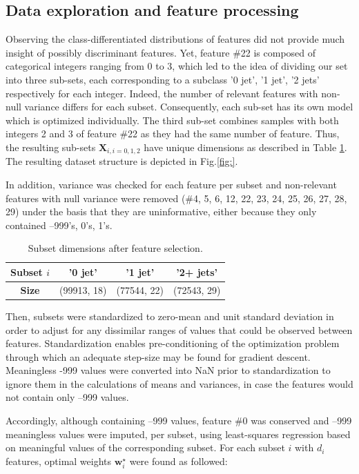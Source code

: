 \documentclass[10pt,conference,compsocconf]{IEEEtran}
\begin{document}
\subsection{Data exploration and feature processing}
Observing the class-differentiated distributions of features did not provide much insight of possibly discriminant features. 
Yet, feature \#22 is composed of categorical integers ranging from 0 to 3, which led to the idea of dividing our set into three sub-sets, 
each corresponding to a subclass '0 jet', '1 jet', '2 jets' respectively for each integer. 
Indeed, the number of relevant features with non-null variance differs for each subset. Consequently, each sub-set has its own model which is optimized individually.
The third sub-set combines samples with both integers 2 and 3 of feature \#22 as they had the same number of feature. 
Thus, the resulting sub-sets $\mathbf{X}_{i, i=0,1,2}$ have unique dimensions as described in Table \ref{tab:subset}. The resulting dataset structure is depicted in Fig.\ref{fig:}.

In addition, variance was checked for each feature per subset and non-relevant features with null variance were removed 
(\#4, 5, 6, 12, 22, 23, 24, 25, 26, 27, 28, 29) under the basis that they are uninformative, either because they only contained --999's, 0's, 1's.

\begin{table}[]
    \centering
     \caption{Subset dimensions after feature selection.}
    \label{tab:subset}
    \begin{tabular}{|c|c|c|c|}
    \hline
    \textbf{Subset} $i$ &  '0 jet' &  '1 jet' & '2+ jets' \\
    \hline
    \textbf{Size} & (99913, 18) & (77544, 22) & (72543, 29) \\
    \hline
     \end{tabular}
\end{table}

Then, subsets were standardized to zero-mean and unit standard deviation in order to adjust for any dissimilar ranges of values that could be observed between features. Standardization enables pre-conditioning of the optimization problem through which an adequate step-size may be found for gradient descent.
Meaningless -999 values were converted into NaN prior to standardization to ignore them in the calculations of means and variances, in case the features would not contain only --999 values. 

Accordingly, although containing --999 values, feature \#0 was conserved and --999 meaningless values were imputed, per subset, 
using least-squares regression based on meaningful values of the corresponding subset. 
For each subset $i$ with $d_i$ features, optimal weights $\mathbf{w}^{\star}_i$ were found as followed:
\end{document}

